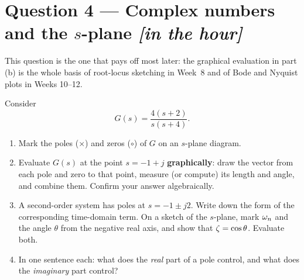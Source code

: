 \documentclass[11pt,a4paper]{article}
\newcommand{\inhour}{\hfill{\small\color{faccent}\itshape[in the hour]}}
\begin{document}
\section*{Question 4 --- Complex numbers and the $s$-plane \inhour}

This question is the one that pays off most later: the graphical evaluation in
part (b) is the whole basis of root-locus sketching in Week~8 and of Bode and
Nyquist plots in Weeks 10--12.

\medskip
Consider
\[
  G(s)=\frac{4(s+2)}{s(s+4)} .
\]

\begin{enumerate}[label=(\alph*)]
\item Mark the poles ($\times$) and zeros ($\circ$) of $G$ on an $s$-plane
      diagram.

\item Evaluate $G(s)$ at the point $s=-1+j$ \textbf{graphically}: draw the
      vector from each pole and zero to that point, measure (or compute) its
      length and angle, and combine them. Confirm your answer algebraically.

\item A second-order system has poles at $s=-1\pm j2$. Write down the form of
      the corresponding time-domain term. On a sketch of the $s$-plane, mark
      $\omega_{n}$ and the angle $\theta$ from the negative real axis, and show that
      $\zeta=\cos\theta$. Evaluate both.

\item In one sentence each: what does the \emph{real} part of a pole control,
      and what does the \emph{imaginary} part control?
\end{enumerate}
\end{document}
